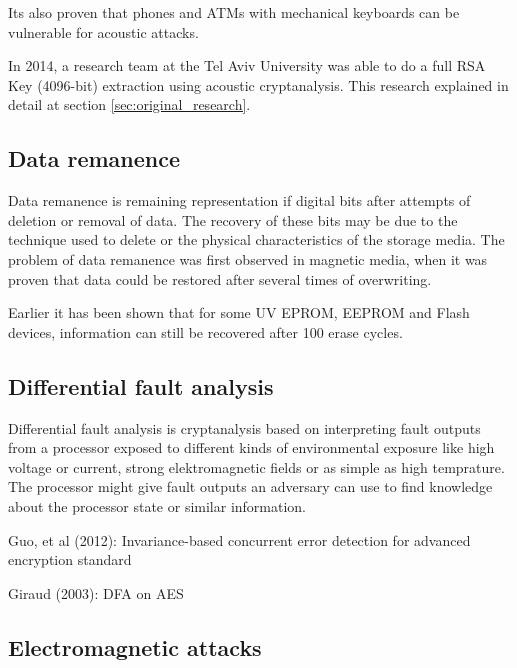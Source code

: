 Its also proven that phones and ATMs with mechanical keyboards can be vulnerable for acoustic attacks\cite{KybdEmanation}.

In 2014, a research team at the Tel Aviv University was able to do a full RSA Key (4096-bit) extraction using acoustic cryptanalysis. 
This research explained in detail at section \ref{sec:original_research}.

\subsection{Data remanence}\label{sec:data_remanence}

Data remanence is remaining representation if digital bits after attempts of deletion or removal\cite{wiki_data_remanence} of data. 
The recovery of these bits may be due to the technique used to delete or the physical characteristics of the storage media. 
The problem of data remanence was first observed in magnetic media, when it was proven that data could be restored after several times of overwriting. 

Earlier it has been shown that for some UV EPROM, EEPROM and Flash devices, information can still be recovered after 100 erase cycles\cite{data_remanence_flash}.


\subsection{Differential fault analysis}\label{sec:differential_fault_analysis}

Differential fault analysis is cryptanalysis based on interpreting fault outputs from a processor exposed to different kinds of environmental exposure like high voltage or current, strong elektromagnetic fields or as simple as high temprature. 
The processor might give fault outputs an adversary can use to find knowledge about the processor state or similar information.


Guo, et al (2012): Invariance-based concurrent error detection for advanced encryption standard\cite{dfa_guo}

Giraud (2003): DFA on AES\cite{dfa_aes}

\subsection{Electromagnetic attacks}\label{sec:electromagnetic_attacks}

